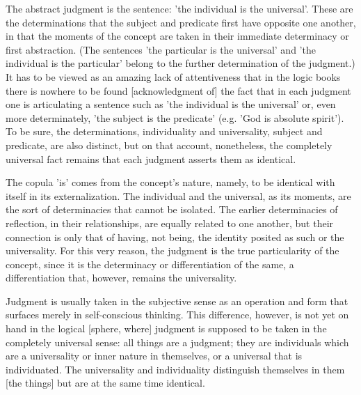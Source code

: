 The abstract judgment is the sentence:
'the individual is the universal'.
These are the determinations
that the subject and predicate
first have opposite one another,
in that the moments of the concept are taken
in their immediate determinacy or first abstraction.
(The sentences 'the particular is the universal' and
'the individual is the particular' belong to
the further determination of the judgment.)
It has to be viewed as an amazing lack of attentiveness that
in the logic books there is nowhere to be found [acknowledgment of]
the fact that in each judgment one is articulating a sentence such as
'the individual is the universal'
or, even more determinately,
'the subject is the predicate'
(e.g. 'God is absolute spirit').
To be sure, the determinations, individuality and universality,
subject and predicate, are also distinct,
but on that account, nonetheless,
the completely universal fact remains that
each judgment asserts them as identical.

The copula 'is' comes from the concept's nature, namely,
to be identical with itself in its externalization.
The individual and the universal, as its moments,
are the sort of determinacies that cannot be isolated.
The earlier determinacies of reflection, in their relationships,
are equally related to one another,
but their connection is only that of having, not being,
the identity posited as such or the universality.
For this very reason, the judgment is
the true particularity of the concept,
since it is the determinacy or differentiation of the same,
a differentiation that, however, remains the universality.

Judgment is usually taken in the subjective sense
as an operation and form that surfaces
merely in self-conscious thinking.
This difference, however, is not yet on hand
in the logical [sphere, where]
judgment is supposed to be taken
in the completely universal sense:
all things are a judgment;
they are individuals which are a universality
or inner nature in themselves,
or a universal that is individuated.
The universality and individuality
distinguish themselves in them [the things]
but are at the same time identical.

